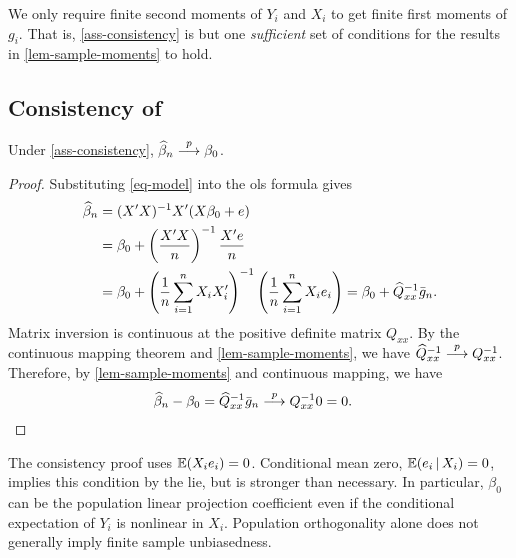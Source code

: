 \documentclass[a4paper,12pt]{article}
\begin{document}
\begin{remark}\label{rem-sufficient-conditions}
	We only require finite second moments of $Y_i$ and $X_i$ to get finite first moments of $g_i$.
	That is, \autoref{ass-consistency} is but one \emph{sufficient} set of conditions for the
	results in \autoref{lem-sample-moments} to hold.
\end{remark}

\subsection{Consistency of }

\begin{theorem}\label{thm-ols-consistency}
	Under \autoref{ass-consistency}, $\widehat\beta_n\overset{p}{\longrightarrow}\beta_0$.
\end{theorem}
\begin{proof}
	Substituting \eqref{eq-model} into the \gls{ols} formula gives
	\begin{align}
		\widehat\beta_n
		&=(X^{\prime} X)^{-1} X^{\prime}(X\beta_0+e)\\
		&=\beta_0+\left(\frac{X^{\prime} X}{n}\right)^{-1}\frac{X^{\prime} e}{n}\\
		&=\beta_0+\left(\frac1n\sum_{i=1}^{n} X_i X_i^{\prime}\right)^{-1}\left(\frac1n\sum_{i=1}^{n} X_i e_i\right) \label{eq-ols-error}
		=\beta_0+\widehat Q_{xx}^{-1}\bar g_n.
	\end{align}
	Matrix inversion is continuous at the positive definite matrix $Q_{xx}$.
	By the continuous mapping theorem and \autoref{lem-sample-moments}, we have
	$\widehat Q_{xx}^{-1}\overset{p}{\longrightarrow} Q_{xx}^{-1}$.
	Therefore, by \autoref{lem-sample-moments} and continuous mapping, we have
	\begin{align*}
		\widehat\beta_n-\beta_0
		&=\widehat Q_{xx}^{-1}\bar g_n\overset{p}{\longrightarrow} Q_{xx}^{-1}0=0.
		\qedhere
	\end{align*}
\end{proof}

\begin{remark}
	The consistency proof uses $\operatorname{\mathbb{E}}(X_ie_i)=0$.
	Conditional mean zero, $\operatorname{\mathbb{E}}(e_i\mathpunct{}|\mathpunct{} X_i)=0$, implies this condition by the \gls{lie},
	but is stronger than necessary.
	In particular, $\beta_0$ can be the population linear projection coefficient
	even if the conditional expectation of $Y_i$ is nonlinear in $X_i$.
	Population orthogonality alone does not generally imply finite sample unbiasedness.
\end{remark}
\end{document}

